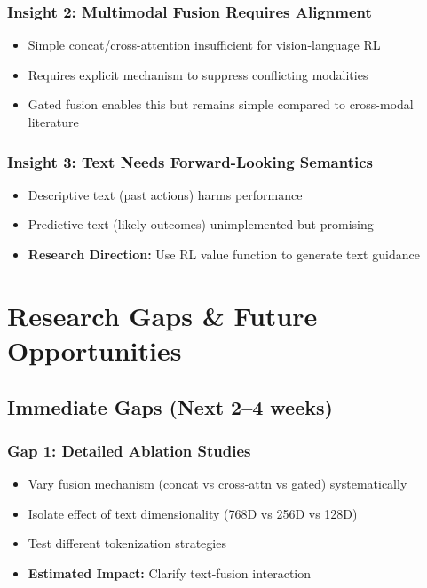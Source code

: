 \documentclass[12pt,a4paper,openany]{report}
\begin{document}
\subsection{Insight 2: Multimodal Fusion Requires Alignment}

\begin{itemize}
    \item Simple concat/cross-attention insufficient for vision-language RL
    \item Requires explicit mechanism to suppress conflicting modalities
    \item Gated fusion enables this but remains simple compared to cross-modal literature
\end{itemize}

\subsection{Insight 3: Text Needs Forward-Looking Semantics}

\begin{itemize}
    \item Descriptive text (past actions) harms performance
    \item Predictive text (likely outcomes) unimplemented but promising
    \item \textbf{Research Direction:} Use RL value function to generate text guidance
\end{itemize}

\chapter{Research Gaps \& Future Opportunities}

\section{Immediate Gaps (Next 2--4 weeks)}

\subsection{Gap 1: Detailed Ablation Studies}

\begin{itemize}
    \item Vary fusion mechanism (concat vs cross-attn vs gated) systematically
    \item Isolate effect of text dimensionality (768D vs 256D vs 128D)
    \item Test different tokenization strategies
    \item \textbf{Estimated Impact:} Clarify text-fusion interaction
\end{itemize}
\end{document}
